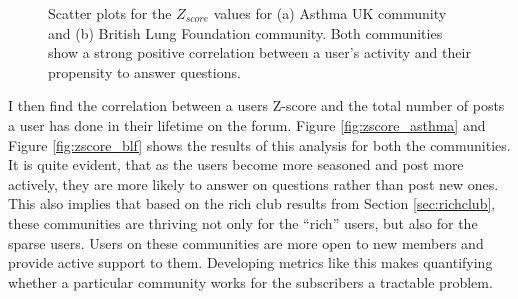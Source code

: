 \begin{figure}[!ht]
    \centering
    \caption{ Scatter plots for the $Z_{score}$ values for (a) Asthma UK community and (b) British Lung Foundation community. Both communities show a strong positive correlation between a user's activity and their propensity to answer questions. }
\end{figure}

I then find the correlation between a users Z-score and the total number of posts a user has done in their lifetime on the forum. Figure \ref{fig:zscore_asthma} and Figure \ref{fig:zscore_blf} shows the results of this analysis for both the communities. It is quite evident, that as the users become more seasoned and post more actively, they are more likely to answer on questions rather than post new ones. This also implies that based on the rich club results from Section \ref{sec:richclub}, these communities are thriving not only for the ``rich'' users, but also for the sparse users. Users on these communities are more open to new members and provide active support to them. 
Developing metrics like this makes quantifying whether a particular community works for the subscribers a tractable problem.


